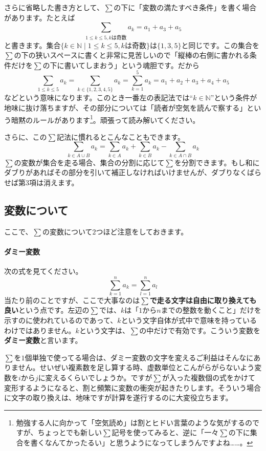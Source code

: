 さらに省略した書き方として、$\sum$の下に「変数の満たすべき条件」を書く場合があります。たとえば
\[
\sum_{1\leq k\leq 5, \text{$k$は奇数}} a_k = a_1 + a_3 + a_5
\]
と書きます。集合$\{k\in\mathbb{N}\mid 1\leq k\leq 5, \text{$k$は奇数}\}$は$\{1,3,5\}$と同じです。この集合を$\sum$の下の狭いスペースに書くと非常に見苦しいので「縦棒の右側に書かれる条件だけを$\sum$の下に書いてしまおう」という魂胆です。だから
\[
\sum_{1\leq k\leq 5} a_k = \sum_{k\in\{1,2,3,4,5\}} a_k = \sum_{k = 1}^5 a_k = a_1 + a_2 + a_3 + a_4 + a_5
\]
などという意味になります。このとき一番左の表記法では``$k\in\mathbb{N}$''という条件が地味に抜け落ちますが、その部分については「読者が空気を読んで察する」という暗黙のルールがあります\footnote{勉強する人に向かって「空気読め」は割とヒドい言葉のような気がするのですが、ちょっとでも新しい$\sum$記号を使ってみると、逆に「一々$\sum$の下に集合を書くなんてかったるい」と思うようになってしまうんですよね……。}。頑張って読み解いてください。

さらに、この$\sum$記法に慣れるとこんなこともできます。
\[
\sum_{k \in A\cup B} a_k = \sum_{k \in A} a_k  + \sum_{k \in B} a_k - \sum_{k \in A\cap B} a_k
\]
$\sum$の変数が集合を走る場合、集合の分割に応じて$\sum$を分割できます。もし和にダブりがあればその部分を引いて補正しなければいけませんが、ダブりなくばらせば第$3$項は消えます。

\subsection{変数について}

ここで、$\sum$の変数について$2$つほど注意をしておきます。

\paragraph{ダミー変数}

次の式を見てください。
\[
\sum_{k = 1}^n a_k = \sum_{l = 1}^n a_l
\]
当たり前のことですが、ここで大事なのは\textbf{$\sum$で走る文字は自由に取り換えても良い}という点です。左辺の$\sum$では、$k$は「$1$から$n$までの整数を動くこと」だけを示すのに使われているのであって、$k$という文字自体が式中で意味を持っているわけではありません。$k$という文字は、$\sum$の中だけで有効です。こういう変数を\textbf{ダミー変数}と言います。

$\sum$を$1$個単独で使ってる場合は、ダミー変数の文字を変えるご利益はそんなにありません。せいぜい複素数を足し算する時、虚数単位とこんがらがらないよう変数を$i$から$j$に変えるくらいでしょうか。ですが$\sum$が入った複数個の式をかけて変形するようになると、割と頻繁に変数の衝突が起きたりします。そういう場合に文字の取り換えは、地味ですが計算を遂行するのに大変役立ちます。

